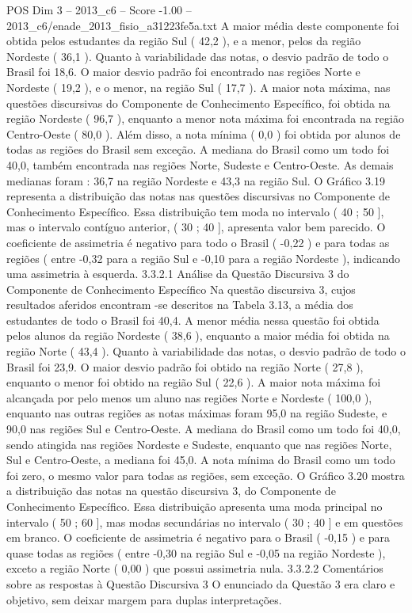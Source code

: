 \begin{textsample}{POS Dim 3 – 2013\_c6 – Score -1.00 – 2013\_c6/enade\_2013\_fisio\_a31223fe5a.txt}
A maior média deste componente foi obtida pelos estudantes da região Sul ( 42,2 ), e a menor, pelos da região Nordeste ( 36,1 ).
Quanto à variabilidade das notas, o desvio padrão de todo o Brasil foi 18,6.
O maior desvio padrão foi encontrado nas regiões Norte e Nordeste ( 19,2 ), e o menor, na região Sul ( 17,7 ).
A maior nota máxima, nas questões discursivas do Componente de Conhecimento Específico, foi obtida na região Nordeste ( 96,7 ), enquanto a menor nota máxima foi encontrada na região Centro-Oeste ( 80,0 ).
Além disso, a nota mínima ( 0,0 ) foi obtida por alunos de todas as regiões do Brasil sem exceção.
A mediana do Brasil como um todo foi 40,0, também encontrada nas regiões Norte, Sudeste e Centro-Oeste.
As demais medianas foram : 36,7 na região Nordeste e 43,3 na região Sul.
O Gráfico 3.19 representa a distribuição das notas nas questões discursivas no Componente de Conhecimento Específico.
Essa distribuição tem moda no intervalo ( 40 ; 50 ], mas o intervalo contíguo anterior, ( 30 ; 40 ], apresenta valor bem parecido.
O coeficiente de assimetria é negativo para todo o Brasil ( -0,22 ) e para todas as regiões ( entre -0,32 para a região Sul e -0,10 para a região Nordeste ), indicando uma assimetria à esquerda. 3.3.2.1 Análise da Questão Discursiva 3 do Componente de Conhecimento Específico Na questão discursiva 3, cujos resultados aferidos encontram -se descritos na Tabela 3.13, a média dos estudantes de todo o Brasil foi 40,4.
A menor média nessa questão foi obtida pelos alunos da região Nordeste ( 38,6 ), enquanto a maior média foi obtida na região Norte ( 43,4 ).
Quanto à variabilidade das notas, o desvio padrão de todo o Brasil foi 23,9.
O maior desvio padrão foi obtido na região Norte ( 27,8 ), enquanto o menor foi obtido na região Sul ( 22,6 ).
A maior nota máxima foi alcançada por pelo menos um aluno nas regiões Norte e Nordeste ( 100,0 ), enquanto nas outras regiões as notas máximas foram 95,0 na região Sudeste, e 90,0 nas regiões Sul e Centro-Oeste.
A mediana do Brasil como um todo foi 40,0, sendo atingida nas regiões Nordeste e Sudeste, enquanto que nas regiões Norte, Sul e Centro-Oeste, a mediana foi 45,0.
A nota mínima do Brasil como um todo foi zero, o mesmo valor para todas as regiões, sem exceção.
O Gráfico 3.20 mostra a distribuição das notas na questão discursiva 3, do Componente de Conhecimento Específico.
Essa distribuição apresenta uma moda principal no intervalo ( 50 ; 60 ], mas modas secundárias no intervalo ( 30 ; 40 ] e em questões em branco.
O coeficiente de assimetria é negativo para o Brasil ( -0,15 ) e para quase todas as regiões ( entre -0,30 na região Sul e -0,05 na região Nordeste ), exceto a região Norte ( 0,00 ) que possui assimetria nula. 3.3.2.2 Comentários sobre as respostas à Questão Discursiva 3 O enunciado da Questão 3 era claro e objetivo, sem deixar margem para duplas interpretações.

\end{textsample}
